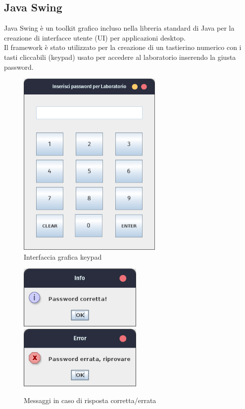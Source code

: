 \documentclass[italian,12pt,a4paper]{article}
\begin{document}
	\subsection{Java Swing}
	
	Java Swing è un toolkit grafico incluso nella libreria standard di Java per la creazione di interfacce utente (UI) per applicazioni desktop.\\
	Il framework è stato utilizzato per la creazione di un tastierino numerico con i tasti cliccabili (keypad) usato per accedere al laboratorio inserendo la giusta password.
	
	\begin{figure}[!h]
		\centering
		\includegraphics[width=7cm]{screen_keypad}
		\caption{Interfaccia grafica keypad}
		\label{fig:screen_key}
	\end{figure}
	
	
	\begin{figure}
		\centering
		\includegraphics[width=6cm]{screen_corr}\hspace{1cm}
		\includegraphics[width=6cm]{screen_err}
		\caption{Messaggi in caso di risposta corretta/errata}
		\label{fig:screen_allineate}
	\end{figure}
	
\end{document}
